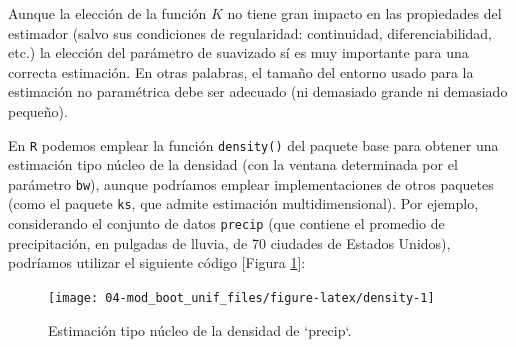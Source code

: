 \documentclass[]{book}
\newenvironment{Shaded}{\begin{snugshade}}{\end{snugshade}}
\newcommand{\KeywordTok}[1]{\textcolor[rgb]{0.13,0.29,0.53}{\textbf{#1}}}
\newcommand{\DataTypeTok}[1]{\textcolor[rgb]{0.13,0.29,0.53}{#1}}
\newcommand{\DecValTok}[1]{\textcolor[rgb]{0.00,0.00,0.81}{#1}}
\newcommand{\FloatTok}[1]{\textcolor[rgb]{0.00,0.00,0.81}{#1}}
\newcommand{\StringTok}[1]{\textcolor[rgb]{0.31,0.60,0.02}{#1}}
\newcommand{\CommentTok}[1]{\textcolor[rgb]{0.56,0.35,0.01}{\textit{#1}}}
\newcommand{\OtherTok}[1]{\textcolor[rgb]{0.56,0.35,0.01}{#1}}
\newcommand{\OperatorTok}[1]{\textcolor[rgb]{0.81,0.36,0.00}{\textbf{#1}}}
\newcommand{\NormalTok}[1]{#1}
\theoremstyle{definition}
\theoremstyle{definition}
\theoremstyle{definition}
\theoremstyle{remark}
\begin{document}
Aunque la elección de la función \(K\) no tiene gran impacto en las
propiedades del estimador (salvo sus condiciones de regularidad:
continuidad, diferenciabilidad, etc.) la elección del parámetro de
suavizado sí es muy importante para una correcta estimación. En otras
palabras, el tamaño del entorno usado para la estimación no paramétrica
debe ser adecuado (ni demasiado grande ni demasiado pequeño).

En \texttt{R} podemos emplear la función \texttt{density()} del paquete
base para obtener una estimación tipo núcleo de la densidad (con la
ventana determinada por el parámetro \texttt{bw}), aunque podríamos
emplear implementaciones de otros paquetes (como el paquete \texttt{ks},
que admite estimación multidimensional). Por ejemplo, considerando el
conjunto de datos \texttt{precip} (que contiene el promedio de
precipitación, en pulgadas de lluvia, de 70 ciudades de Estados Unidos),
podríamos utilizar el siguiente código {[}Figura \ref{fig:density}{]}:

\begin{Shaded}
\end{Shaded}

\begin{figure}[!htb]

{\centering \texttt{[image: 04-mod\_boot\_unif\_files/figure-latex/density-1]} 

}

\caption{Estimación tipo núcleo de la densidad de `precip`. }\label{fig:density}
\end{figure}
\end{document}
